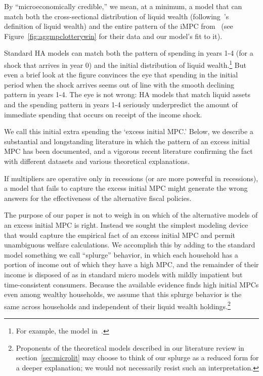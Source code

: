 \documentclass[qe]{econsocart}
\begin{document}
\label{microeconomically-credible}
By ``microeconomically credible,'' we mean, at a minimum, a model that can match both the cross-sectional distribution of liquid wealth (following~\cite{kaplan2014model}'s definition of liquid wealth) and the entire pattern of the iMPC from~\cite{fagereng-mpc-2021} (see Figure~\ref{fig:aggmpclotterywin} for their data and our model's fit to it).

\label{excess-initial-mpc}
Standard HA models can match both the pattern of spending in years 1-4 (for a shock that arrives in year 0) and the initial distribution of liquid wealth.\footnote{For example, the model in~\cite{cstwMPC}.}  But even a brief look at the figure convinces the eye that spending in the initial period when the shock arrives seems out of line with the smooth declining pattern in years 1-4.  The eye is not wrong: HA models that match liquid assets and the spending pattern in years 1-4 seriously underpredict the amount of immediate spending that occurs on receipt of the income shock.

We call this initial extra spending the `excess initial MPC.'  Below, we describe a substantial and longstanding literature in which the pattern of an excess initial MPC has been documented, and a vigorous recent literature confirming the fact with different datasets and various theoretical explanations.

If multipliers are operative only in recessions (or are more powerful in recessions), a model that fails to capture the excess initial MPC might generate the wrong answers for the effectiveness of the alternative fiscal policies.

The purpose of our paper is not to weigh in on which of the alternative models of an excess initial MPC is right.  Instead we sought the simplest modeling device that would capture the empirical fact of an excess initial MPC and permit unambiguous welfare calculations.  We accomplish this by adding to the standard model something we call ``splurge'' behavior, in which each household has a portion of income out of which they have a high MPC, and the remainder of their income is disposed of as in standard micro models with mildly impatient but time-consistent consumers.  Because the available evidence finds high initial MPCs even among wealthy households, we assume that this splurge behavior is the same across households and independent of their liquid wealth holdings.\footnote{Proponents of the theoretical models described in our literature review in section~\ref{sec:microlit} may choose to think of our splurge as a reduced form for a deeper explanation; we would not necessarily resist such an interpretation.}
\end{document}
